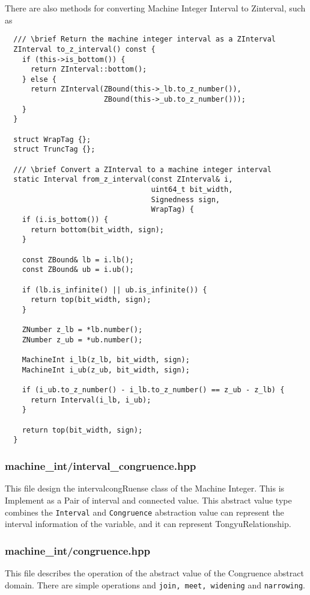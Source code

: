 \documentclass[12pt]{article}
\begin{document}
There are also methods for converting Machine Integer Interval to Zinterval, such as
\begin{lstlisting}
  /// \brief Return the machine integer interval as a ZInterval
  ZInterval to_z_interval() const {
    if (this->is_bottom()) {
      return ZInterval::bottom();
    } else {
      return ZInterval(ZBound(this->_lb.to_z_number()),
                       ZBound(this->_ub.to_z_number()));
    }
  }

  struct WrapTag {};
  struct TruncTag {};

  /// \brief Convert a ZInterval to a machine integer interval
  static Interval from_z_interval(const ZInterval& i,
                                  uint64_t bit_width,
                                  Signedness sign,
                                  WrapTag) {
    if (i.is_bottom()) {
      return bottom(bit_width, sign);
    }

    const ZBound& lb = i.lb();
    const ZBound& ub = i.ub();

    if (lb.is_infinite() || ub.is_infinite()) {
      return top(bit_width, sign);
    }

    ZNumber z_lb = *lb.number();
    ZNumber z_ub = *ub.number();

    MachineInt i_lb(z_lb, bit_width, sign);
    MachineInt i_ub(z_ub, bit_width, sign);

    if (i_ub.to_z_number() - i_lb.to_z_number() == z_ub - z_lb) {
      return Interval(i_lb, i_ub);
    }

    return top(bit_width, sign);
  }
\end{lstlisting}

\subsubsection{machine\_int/interval\_congruence.hpp}
This file design the intervalcongRuense class of the Machine Integer. This is Implement as a Pair of interval and connected value. This abstract value type combines the \texttt{Interval} and \texttt{Congruence} abstraction value can represent the interval information of the variable, and it can represent TongyuRelationship.

\subsubsection{machine\_int/congruence.hpp}
This file describes the operation of the abstract value of the Congruence abstract domain. There are simple operations and \texttt{join, meet, widening} and \texttt{narrowing}.
\end{document}
